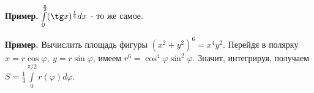 \textbf{Пример.} $\int\limits_{0}^{\frac{\pi}{2}}(\tg x)^{\frac{1}{4}}dx$ - 
то же самое.

\textbf{Пример.} Вычислить площадь фигуры
$(x^2+y^2)^6=x^4y^2$. Перейдя в полярку  $x=r\cos\varphi,~y=r\sin\varphi$,
имеем $r^6=\cos^4\varphi\sin^2\varphi$.  Значит, интегрируя, 
получаем $S=\frac{1}{4}\int\limits_{0}^{\pi/2}r(\varphi)d\varphi$. 

















